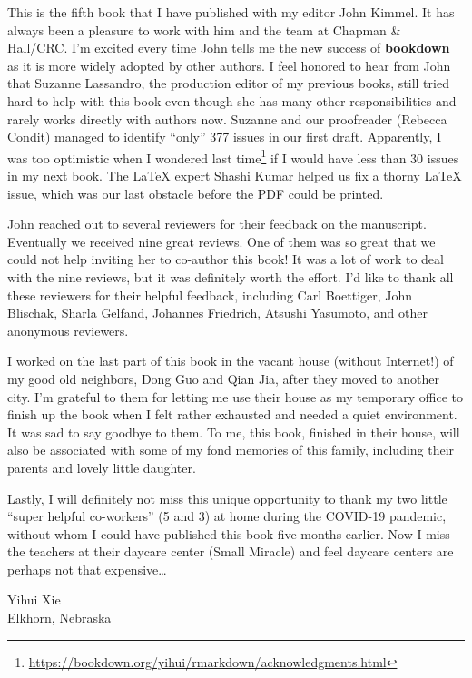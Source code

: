 \documentclass[
  11pt,
]{krantz}
\renewcommand{\href}[2]{#2\footnote{\url{#1}}}
\begin{document}
This is the fifth book that I have published with my editor John Kimmel. It has always been a pleasure to work with him and the team at Chapman \& Hall/CRC. I'm excited every time John tells me the new success of \textbf{bookdown} as it is more widely adopted by other authors. I feel honored to hear from John that Suzanne Lassandro, the production editor of my previous books, still tried hard to help with this book even though she has many other responsibilities and rarely works directly with authors now. Suzanne and our proofreader (Rebecca Condit) managed to identify ``only'' 377 issues in our first draft. Apparently, I was too optimistic \href{https://bookdown.org/yihui/rmarkdown/acknowledgments.html}{when I wondered last time} if I would have less than 30 issues in my next book. The LaTeX expert Shashi Kumar helped us fix a thorny LaTeX issue, which was our last obstacle before the PDF could be printed.

John reached out to several reviewers for their feedback on the manuscript. Eventually we received nine great reviews. One of them was so great that we could not help inviting her to co-author this book! It was a lot of work to deal with the nine reviews, but it was definitely worth the effort. I'd like to thank all these reviewers for their helpful feedback, including Carl Boettiger, John Blischak, Sharla Gelfand, Johannes Friedrich, Atsushi Yasumoto, and other anonymous reviewers.

I worked on the last part of this book in the vacant house (without Internet!) of my good old neighbors, Dong Guo and Qian Jia, after they moved to another city. I'm grateful to them for letting me use their house as my temporary office to finish up the book when I felt rather exhausted and needed a quiet environment. It was sad to say goodbye to them. To me, this book, finished in their house, will also be associated with some of my fond memories of this family, including their parents and lovely little daughter.

Lastly, I will definitely not miss this unique opportunity to thank my two little ``super helpful co-workers'' (5 and 3) at home during the COVID-19 pandemic, without whom I could have published this book five months earlier. Now I miss the teachers at their daycare center (Small Miracle) and feel daycare centers are perhaps not that expensive\ldots{}

\begin{flushright}
Yihui Xie\\
Elkhorn, Nebraska

\end{flushright}
\end{document}
